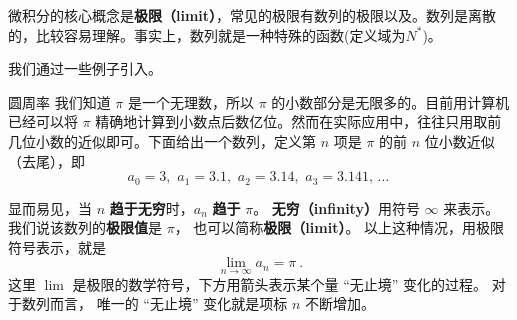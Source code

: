 
微积分的核心概念是\textbf{极限（limit）}，常见的极限有数列的极限以及。数列是离散的，比较容易理解。事实上，数列就是一种特殊的函数(定义域为$N^{*}$)。

我们通过一些例子引入。

\begin{example}{圆周率}\label{ex_Lim0_1}
我们知道 $\pi$ 是一个无理数，所以 $\pi$ 的小数部分是无限多的。目前用计算机已经可以将 $\pi$ 精确地计算到小数点后数亿位。然而在实际应用中，往往只用取前几位小数的近似即可。下面给出一个数列，定义第 $n$ 项是 $\pi$ 的前 $n$ 位小数近似（去尾），即
\begin{equation}\label{eq_Lim0_1}
a_0 = 3,\,\, a_1 = 3.1,\,\, a_2 = 3.14,\,\, a_3 = 3.141,\,\dots~
\end{equation}

显而易见，当 $n$ \textbf{趋于无穷}时，$a_n$ \textbf{趋于} $\pi$。 \textbf{无穷（infinity）}用符号 $\infty$ 来表示。 我们说该数列的\textbf{极限值}是 $\pi$， 也可以简称\textbf{极限（limit）}。 以上这种情况，用极限符号表示，就是
\begin{equation}\label{eq_Lim0_3}
\lim_{n \to \infty } {a_n} = \pi ~.
\end{equation}
这里 $\lim$ 是极限的数学符号，下方用箭头表示某个量 “无止境” 变化的过程。 对于数列而言， 唯一的 “无止境” 变化就是项标 $n$ 不断增加。%
\end{example}





